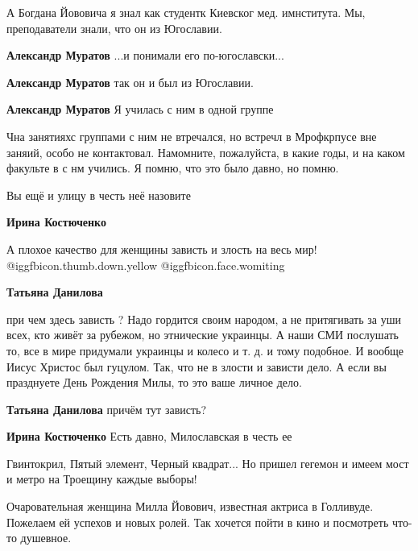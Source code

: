 \begin{itemize}
А Богдана Йововича я знал как студентк Киевског мед. имнститута. Мы,
преподаватели знали, что он из Югославии.

\begin{itemize} %
\textbf{Александр Муратов} ...и понимали его по-югославски...

\textbf{Александр Муратов} так он и был из Югославии.

\textbf{Александр Муратов} Я училась с ним в одной группе


Чна занятияхс группами с ним не втречался, но встречл в Мрофкрпусе вне заняий,
особо не контактовал. Намомните, пожалуйста, в какие годы, и на каком факульте
в с нм учились. Я помню, что это было давно, но помню.

\end{itemize} %

Вы ещё и улицу в честь неё назовите

\begin{itemize} %
\textbf{Ирина Костюченко} 

А плохое качество для женщины зависть и злость на весь мир!
@igg{fbicon.thumb.down.yellow}  @igg{fbicon.face.womiting} 

\textbf{Татьяна Данилова} 

при чем здесь зависть ? Надо гордится своим народом, а не притягивать за уши
всех, кто живёт за рубежом, но этнические украинцы. А наши СМИ послушать то,
все в мире придумали украинцы и колесо и т. д. и тому подобное. И вообще Иисус
Христос был гуцулом. Так, что не в злости и зависти дело. А если вы
празднуете День Рождения Милы, то это ваше личное дело.

\textbf{Татьяна Данилова} причём тут зависть?

\textbf{Ирина Костюченко} Есть давно, Милославская в честь ее
\end{itemize} %


Гвинтокрил, Пятый элемент, Черный квадрат... Но пришел гегемон и имеем мост и
метро на Троещину каждые выборы!


Очаровательная женщина Милла Йовович, известная актриса в Голливуде. Пожелаем
ей успехов и новых ролей. Так хочется пойти в кино и посмотреть что- то
душевное.


\end{itemize}
